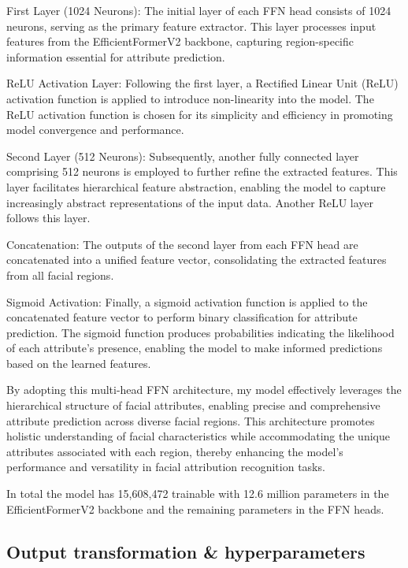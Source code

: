 \documentclass[a4paper,oneside]{article}
\begin{document}
First Layer (1024 Neurons): The initial layer of each FFN head consists of 1024 neurons, serving as the primary feature extractor.
This layer processes input features from the EfficientFormerV2 backbone, capturing region-specific information essential for attribute prediction.

ReLU Activation Layer: Following the first layer, a Rectified Linear Unit (ReLU) \citet{DBLP:journals/corr/abs-1803-08375} activation function is applied to introduce non-linearity into the model.
The ReLU activation function is chosen for its simplicity and efficiency in promoting model convergence and performance.

Second Layer (512 Neurons): Subsequently, another fully connected layer comprising 512 neurons is employed to further refine the extracted features.
This layer facilitates hierarchical feature abstraction, enabling the model to capture increasingly abstract representations of the input data.
Another ReLU layer follows this layer.

Concatenation: The outputs of the second layer from each FFN head are concatenated into a unified feature vector, consolidating the extracted features from all facial regions.

Sigmoid Activation: Finally, a sigmoid activation function is applied to the concatenated feature vector to perform binary classification for attribute prediction.
The sigmoid function produces probabilities indicating the likelihood of each attribute's presence, enabling the model to make informed predictions based on the learned features.

By adopting this multi-head FFN architecture, my model effectively leverages the hierarchical structure of facial attributes, enabling precise and comprehensive attribute prediction across diverse facial regions.
This architecture promotes holistic understanding of facial characteristics while accommodating the unique attributes associated with each region, thereby enhancing the model's performance and versatility in facial attribution recognition tasks.

In total the model has 15,608,472 trainable with 12.6 million parameters in the EfficientFormerV2 backbone and the remaining parameters in the FFN heads.

\subsection{Output transformation \& hyperparameters}
\label{sec:subsection_output_transformation}
\end{document}
